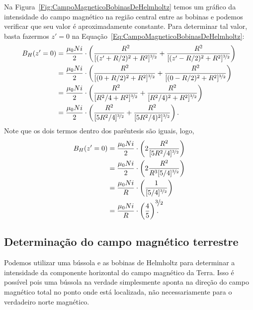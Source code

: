 Na Figura~\ref{Fig:CampoMagneticoBobinasDeHelmholtz} temos um gráfico da intensidade do campo magnético na região central entre as bobinas e podemos verificar que seu valor é aproximadamente constante. Para determinar tal valor, basta fazermos $z' = 0$ na Equação~\eqref{Eq:CampoMagneticoBobinasDeHelmholtz}:
\begin{align}
    B_H(z'=0) &=  \frac{\mu_0 N i}{2} \cdot \left(\frac{R^2}{[(z' + R/2)^2 + R^2]^{\nicefrac{3}{2}}} + \frac{R^2}{[(z' - R/2)^2 + R^2]^{\nicefrac{3}{2}}}\right) \\
    &= \frac{\mu_0 N i}{2} \cdot \left(\frac{R^2}{[(0 + R/2)^2 + R^2]^{\nicefrac{3}{2}}} + \frac{R^2}{[(0 - R/2)^2 + R^2]^{\nicefrac{3}{2}}}\right) \\
    &=  \frac{\mu_0 N i}{2} \cdot \left(\frac{R^2}{[R^2/4 + R^2]^{\nicefrac{3}{2}}} + \frac{R^2}{[R^2/4)^2 + R^2]^{\nicefrac{3}{2}}}\right) \\
    &= \frac{\mu_0 N i}{2} \cdot \left(\frac{R^2}{[5R^2/4]^{\nicefrac{3}{2}}} + \frac{R^2}{[5R^2/4)^2]^{\nicefrac{3}{2}}}\right).
\end{align}
%
Note que os dois termos dentro dos parêntesis são iguais, logo,
\begin{align}
    B_H(z'=0) &= \frac{\mu_0 N i}{2} \cdot \left(2\frac{R^2}{[5R^2/4]^{\nicefrac{3}{2}}}\right) \\
    &= \frac{\mu_0 N i}{2} \cdot \left(2\frac{R^2}{R^3[5/4]^{\nicefrac{3}{2}}}\right) \\
    &= \frac{\mu_0 N i}{R} \cdot \left(\frac{1}{[5/4]^{\nicefrac{3}{2}}}\right) \\
    &= \frac{\mu_0 N i}{R} \cdot \left(\frac{4}{5}\right)^{\rlap{\nicefrac{3}{2}}}.
\end{align}

\subsection{Determinação do campo magnético terrestre}

Podemos utilizar uma bússola e as bobinas de Helmholtz para determinar a intensidade da componente horizontal do campo magnético da Terra. Isso é possível pois uma bússola na verdade simplesmente aponta na direção do campo magnético total no ponto onde está localizada, não necessariamente para o verdadeiro norte magnético.

